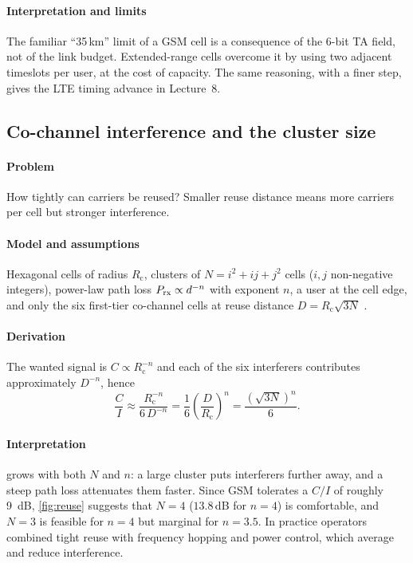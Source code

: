 \documentclass[11pt,a4paper]{article}
\begin{document}
\paragraph{Interpretation and limits} The familiar ``35\,km'' limit of a GSM cell is a
consequence of the 6-bit TA field, not of the link budget. Extended-range cells
overcome it by using two adjacent timeslots per user, at the cost of capacity. The
same reasoning, with a finer step, gives the LTE timing advance in Lecture~8.

\subsection{Co-channel interference and the cluster size}\label{sec:reuse}
\paragraph{Problem} How tightly can carriers be reused? Smaller reuse distance means
more carriers per cell but stronger interference.
\paragraph{Model and assumptions} Hexagonal cells of radius $R_{\mathrm{c}}$, clusters
of $N = i^2 + ij + j^2$ cells ($i,j$ non-negative integers), power-law path loss
$P_{\mathrm{rx}} \propto d^{-n}$ with exponent $n$, a user at the cell edge, and only the six
first-tier co-channel cells at reuse distance $D = R_{\mathrm{c}}\sqrt{3N}$ \cite{rappaport2002wireless}.
\paragraph{Derivation} The wanted signal is $C \propto R_{\mathrm{c}}^{-n}$ and each of the
six interferers contributes approximately $D^{-n}$, hence
\begin{equation}\label{eq:ci}
  \frac{C}{I} \approx \frac{R_{\mathrm{c}}^{-n}}{6\,D^{-n}}
  = \frac{1}{6}\left(\frac{D}{R_{\mathrm{c}}}\right)^{n}
  = \frac{\left(\sqrt{3N}\right)^{n}}{6}.
\end{equation}
\paragraph{Interpretation}  grows with both $N$ and $n$: a large cluster
puts interferers further away, and a steep path loss attenuates them faster. Since
GSM tolerates a $C/I$ of roughly \qty{9}{\dB}, \cref{fig:reuse} suggests that $N=4$
($13.8$\,dB for $n=4$) is comfortable, and $N=3$ is feasible for $n=4$ but marginal
for $n=3.5$. In practice operators combined tight reuse with frequency hopping and
power control, which average and reduce interference.
\end{document}
